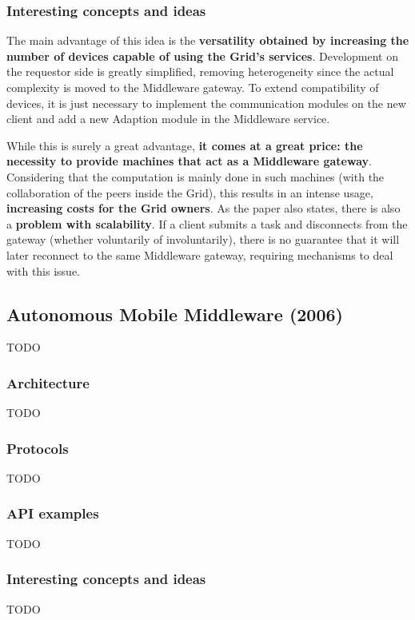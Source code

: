 \subsubsection{Interesting concepts and ideas}
The main advantage of this idea is the \textbf{versatility obtained by increasing the number of devices capable of using the Grid's services}. Development on the requestor side is greatly simplified, removing heterogeneity since the actual complexity is moved to the Middleware gateway. To extend compatibility of devices, it is just necessary to implement the communication modules on the new client and add a new Adaption module in the Middleware service.

While this is surely a great advantage, \textbf{it comes at a great price: the necessity to provide machines that act as a Middleware gateway}. Considering that the computation is mainly done in such machines (with the collaboration of the peers inside the Grid), this results in an intense usage, \textbf{increasing costs for the Grid owners}.
As the paper also states, there is also a \textbf{problem with scalability}. If a client submits a task and disconnects from the gateway (whether voluntarily of involuntarily), there is no guarantee that it will later reconnect to the same Middleware gateway, requiring mechanisms to deal with this issue.

\subsection{Autonomous Mobile Middleware (2006)}
TODO

\subsubsection{Architecture}
TODO

\subsubsection{Protocols}
TODO

\subsubsection{API examples}
TODO

\subsubsection{Interesting concepts and ideas}
TODO
